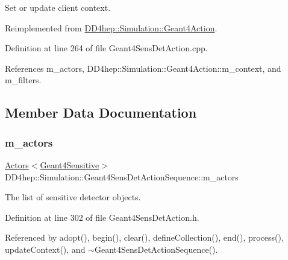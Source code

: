 Set or update client context. 



Reimplemented from \hyperlink{class_d_d4hep_1_1_simulation_1_1_geant4_action_ae3b9daf2af881df956c46568c0743313}{D\+D4hep\+::\+Simulation\+::\+Geant4\+Action}.



Definition at line 264 of file Geant4\+Sens\+Det\+Action.\+cpp.



References m\+\_\+actors, D\+D4hep\+::\+Simulation\+::\+Geant4\+Action\+::m\+\_\+context, and m\+\_\+filters.



\subsection{Member Data Documentation}
\hypertarget{class_d_d4hep_1_1_simulation_1_1_geant4_sens_det_action_sequence_aa383f58ddce351dc9df9451bee3feb0f}{}\label{class_d_d4hep_1_1_simulation_1_1_geant4_sens_det_action_sequence_aa383f58ddce351dc9df9451bee3feb0f} 
\subsubsection{\texorpdfstring{m\+\_\+actors}{m\_actors}}
{\footnotesize\ttfamily \hyperlink{class_d_d4hep_1_1_simulation_1_1_geant4_action_1_1_actors}{Actors}$<$\hyperlink{class_d_d4hep_1_1_simulation_1_1_geant4_sensitive}{Geant4\+Sensitive}$>$ D\+D4hep\+::\+Simulation\+::\+Geant4\+Sens\+Det\+Action\+Sequence\+::m\+\_\+actors\hspace{0.3cm}{\ttfamily [protected]}}



The list of sensitive detector objects. 



Definition at line 302 of file Geant4\+Sens\+Det\+Action.\+h.



Referenced by adopt(), begin(), clear(), define\+Collection(), end(), process(), update\+Context(), and $\sim$\+Geant4\+Sens\+Det\+Action\+Sequence().

\hypertarget{class_d_d4hep_1_1_simulation_1_1_geant4_sens_det_action_sequence_a8feceb005db2ea028c4a778dd600b00b}{}\label{class_d_d4hep_1_1_simulation_1_1_geant4_sens_det_action_sequence_a8feceb005db2ea028c4a778dd600b00b} 
